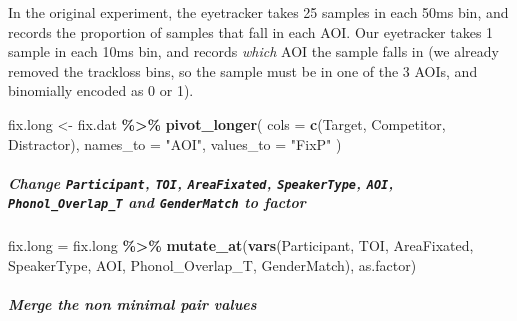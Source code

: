 \documentclass[
]{article}
\newenvironment{Shaded}{\begin{snugshade}}{\end{snugshade}}
\newcommand{\AttributeTok}[1]{\textcolor[rgb]{0.13,0.29,0.53}{#1}}
\newcommand{\FunctionTok}[1]{\textcolor[rgb]{0.13,0.29,0.53}{\textbf{#1}}}
\newcommand{\NormalTok}[1]{#1}
\newcommand{\OtherTok}[1]{\textcolor[rgb]{0.56,0.35,0.01}{#1}}
\newcommand{\SpecialCharTok}[1]{\textcolor[rgb]{0.81,0.36,0.00}{\textbf{#1}}}
\newcommand{\StringTok}[1]{\textcolor[rgb]{0.31,0.60,0.02}{#1}}
\begin{document}
In the original experiment, the eyetracker takes 25 samples in each 50ms
bin, and records the proportion of samples that fall in each AOI. Our
eyetracker takes 1 sample in each 10ms bin, and records \emph{which} AOI
the sample falls in (we already removed the trackloss bins, so the
sample must be in one of the 3 AOIs, and binomially encoded as 0 or 1).

\begin{Shaded}
\begin{Highlighting}[]
\NormalTok{fix.long }\OtherTok{\textless{}{-}}\NormalTok{ fix.dat }\SpecialCharTok{\%\textgreater{}\%}
  \FunctionTok{pivot\_longer}\NormalTok{(}
    \AttributeTok{cols =} \FunctionTok{c}\NormalTok{(Target, Competitor, Distractor),}
    \AttributeTok{names\_to =} \StringTok{"AOI"}\NormalTok{,}
    \AttributeTok{values\_to =} \StringTok{"FixP"}
\NormalTok{  )}
\end{Highlighting}
\end{Shaded}

\subparagraph{\texorpdfstring{Change \texttt{Participant}, \texttt{TOI},
\texttt{AreaFixated}, \texttt{SpeakerType}, \texttt{AOI},
\texttt{Phonol\_Overlap\_T} and \texttt{GenderMatch} to
factor}{Change Participant, TOI, AreaFixated, SpeakerType, AOI, Phonol\_Overlap\_T and GenderMatch to factor}}\label{change-participant-toi-areafixated-speakertype-aoi-phonol_overlap_t-and-gendermatch-to-factor}

\begin{Shaded}
\begin{Highlighting}[]
\NormalTok{fix.long }\OtherTok{=}\NormalTok{ fix.long }\SpecialCharTok{\%\textgreater{}\%} \FunctionTok{mutate\_at}\NormalTok{(}\FunctionTok{vars}\NormalTok{(Participant, TOI, AreaFixated, SpeakerType, AOI, Phonol\_Overlap\_T, GenderMatch), as.factor)}
\end{Highlighting}
\end{Shaded}

\subparagraph{Merge the non minimal pair
values}\label{merge-the-non-minimal-pair-values}

\begin{Shaded}
\end{Shaded}
\end{document}
